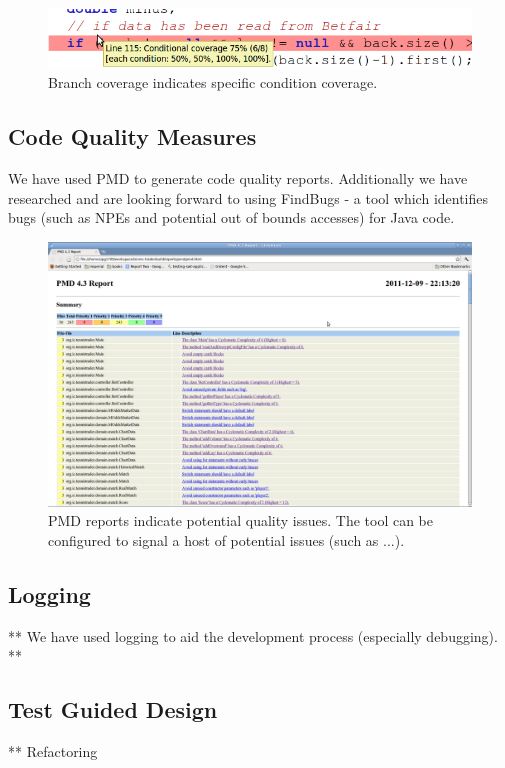 \documentclass[10pt]{article}
\begin{document}
\begin{figure}[ht]
\centering
\includegraphics[bb=0 0 700 100, scale = 0.49]{branch.png}
\caption{Branch coverage indicates specific condition coverage.}
\end{figure}

\subsection{Code Quality Measures}

We have used PMD to generate code quality reports. Additionally we have researched and are looking forward to using FindBugs - a tool which identifies bugs (such as NPEs and potential out of bounds accesses) for Java code.

\begin{figure}[ht]
\centering
\includegraphics[bb=0 0 1680 1050, scale = 0.2]{pmd.png}
\caption{PMD reports indicate potential quality issues. The tool can be configured to signal a host of potential issues (such as ...).}
\end{figure}

\subsection{Logging}
**
We have used logging to aid the development process (especially debugging).
**
\subsection{Test Guided Design}
**
Refactoring
\end{document}
